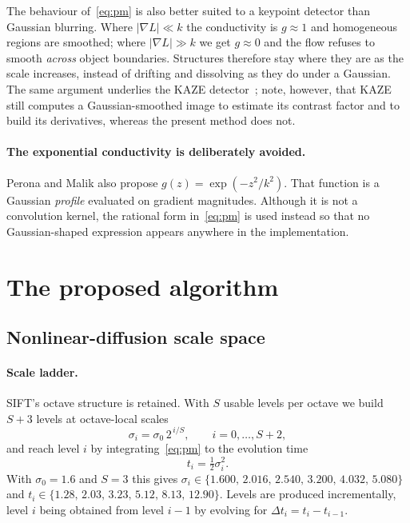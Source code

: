 \documentclass[11pt,a4paper]{article}
\begin{document}
The behaviour of~\eqref{eq:pm} is also better suited to a keypoint detector
than Gaussian blurring. Where $|\nabla L|\ll k$ the conductivity is
$g\approx1$ and homogeneous regions are smoothed; where $|\nabla L|\gg k$ we
get $g\approx0$ and the flow refuses to smooth \emph{across} object
boundaries. Structures therefore stay where they are as the scale increases,
instead of drifting and dissolving as they do under a Gaussian. The same
argument underlies the KAZE detector~\cite{kaze2012}; note, however, that KAZE
still computes a Gaussian-smoothed image to estimate its contrast factor and to
build its derivatives, whereas the present method does not.

\paragraph{The exponential conductivity is deliberately avoided.}
Perona and Malik also propose $g(z)=\exp(-z^{2}/k^{2})$. That function is a
Gaussian \emph{profile} evaluated on gradient magnitudes. Although it is not a
convolution kernel, the rational form in~\eqref{eq:pm} is used instead so that
no Gaussian-shaped expression appears anywhere in the implementation.

\section{The proposed algorithm}

\subsection{Nonlinear-diffusion scale space}
\label{sec:ss}

\paragraph{Scale ladder.} SIFT's octave structure is retained. With $S$ usable
levels per octave we build $S+3$ levels at octave-local scales
\begin{equation}
\sigma_i=\sigma_0\,2^{\,i/S},\qquad i=0,\dots,S+2 ,
\end{equation}
and reach level $i$ by integrating~\eqref{eq:pm} to the evolution time
\begin{equation}
t_i=\tfrac12\sigma_i^{2} .
\label{eq:tsigma}
\end{equation}
With $\sigma_0=1.6$ and $S=3$ this gives
$\sigma_i\in\{1.600,\,2.016,\,2.540,\,3.200,\,4.032,\,5.080\}$ and
$t_i\in\{1.28,\,2.03,\,3.23,\,5.12,\,8.13,\,12.90\}$. Levels are produced
incrementally, level $i$ being obtained from level $i-1$ by evolving for
$\Delta t_i=t_i-t_{i-1}$.
\end{document}

